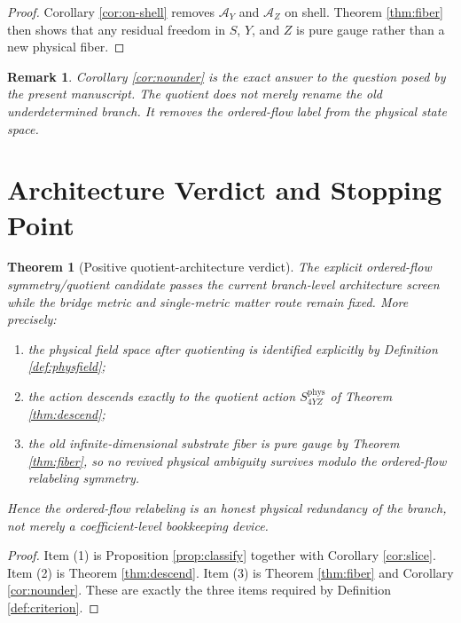 \documentclass[11pt]{article}
\newcommand{\AY}{\mathcal A_Y}
\newcommand{\AZ}{\mathcal A_Z}
\newtheorem{remark}{Remark}
\newtheorem{theorem}{Theorem}
\begin{document}
\begin{proof}
Corollary \ref{cor:on-shell} removes \(\AY\) and \(\AZ\) on shell. Theorem \ref{thm:fiber} then shows that any residual freedom in \(S\), \(Y\), and \(Z\) is pure gauge rather than a new physical fiber.
\end{proof}

\begin{remark}
Corollary \ref{cor:nounder} is the exact answer to the question posed by the present manuscript. The quotient does not merely rename the old underdetermined branch. It removes the ordered-flow label from the physical state space.
\end{remark}

\section{Architecture Verdict and Stopping Point}

\begin{theorem}[Positive quotient-architecture verdict]
\label{thm:verdict}
The explicit ordered-flow symmetry/quotient candidate passes the current branch-level architecture screen while the bridge metric and single-metric matter route remain fixed. More precisely:
\begin{enumerate}
    \item the physical field space after quotienting is identified explicitly by Definition \ref{def:physfield};
    \item the action descends exactly to the quotient action \(S_{4YZ}^{\mathrm{phys}}\) of Theorem \ref{thm:descend};
    \item the old infinite-dimensional substrate fiber is pure gauge by Theorem \ref{thm:fiber}, so no revived physical ambiguity survives modulo the ordered-flow relabeling symmetry.
\end{enumerate}
Hence the ordered-flow relabeling is an honest physical redundancy of the branch, not merely a coefficient-level bookkeeping device.
\end{theorem}

\begin{proof}
Item (1) is Proposition \ref{prop:classify} together with Corollary \ref{cor:slice}. Item (2) is Theorem \ref{thm:descend}. Item (3) is Theorem \ref{thm:fiber} and Corollary \ref{cor:nounder}. These are exactly the three items required by Definition \ref{def:criterion}.
\end{proof}
\end{document}
